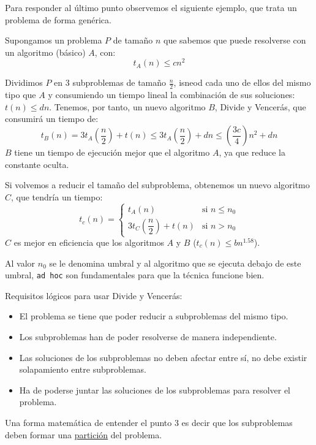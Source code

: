 Para responder al último punto observemos el siguiente ejemplo, que trata un problema de forma genérica.
\begin{ejemplo}
    Supongamos un problema $P$ de tamaño $n$ que sabemos que puede resolverse con un algoritmo (básico) $A$, con:
    \begin{equation*}
        t_A(n) \leq cn^2 
    \end{equation*}

    Dividimos $P$ en 3 subproblemas de tamaño $\frac{n}{2}$, isneod cada uno de ellos del mismo tipo que $A$ y consumiendo un tiempo lineal la combinación de sus soluciones: $t(n) \leq dn$.
    Tenemos, por tanto, un nuevo algoritmo $B$, Divide y Vencerás, que consumirá un tiempo de:
    \begin{equation*}
        t_B(n) = 3t_A\left(\dfrac{n}{2}\right)+t(n) \leq 3t_A\left(\dfrac{n}{2}\right) + dn \leq \left(\dfrac{3c}{4}\right)n^2 + dn
    \end{equation*}
    $B$ tiene un tiempo de ejecución mejor que el algoritmo $A$, ya que reduce la constante oculta.

    Si volvemos a reducir el tamaño del subproblema, obtenemos un nuevo algoritmo $C$, que tendría un tiempo:
    \begin{equation*}
        t_c(n) = \left\{ \begin{array}{ll}
            t_A(n) & \text{si\ } n \leq n_0 \\
            3t_C\left(\dfrac{n}{2}\right) + t(n) & \text{si\ } n > n_0
        \end{array}\right.
    \end{equation*}
    $C$ es mejor en eficiencia que los algoritmos $A$ y $B$ ($t_c(n) \leq bn^{1.58}$). 
\end{ejemplo}
Al valor $n_0$ se le denomina umbral y al algoritmo que se ejecuta debajo de este umbral, \verb|ad hoc| son fundamentales para que la técnica funcione bien.

Requisitos lógicos para usar Divide y Vencerás:
\begin{itemize}
    \item El problema se tiene que poder reducir a subproblemas del mismo tipo.
    \item Los subproblemas han de poder resolverse de manera independiente.
    \item Las soluciones de los subproblemas no deben afectar entre sí, no debe existir solapamiento entre subproblemas.
    \item Ha de poderse juntar las soluciones de los subproblemas para resolver el problema.
\end{itemize}
Una forma matemática de entender el punto 3 es decir que los subproblemas deben formar una \ul{partición} del problema.

